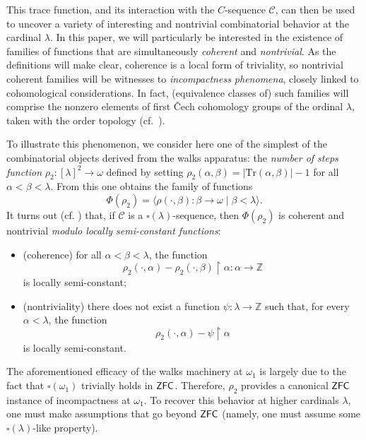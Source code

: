 \documentclass{amsart}
\numberwithin{theorem}{section}
\theoremstyle{definition}
\newcommand{\bb}{\mathbb}
\newcommand{\mc}{\mathcal}
\newcommand{\ra}{\rightarrow}
\newcommand{\Tr}{\mathrm{Tr}}
\newcommand{\ZFC}{\sf ZFC}
\begin{document}
This trace function, and its interaction with the $C$-sequence $\mc{C}$, can then be used 
to uncover a variety of interesting and nontrivial combinatorial behavior at the cardinal 
$\lambda$. In this paper, we will particularly be interested in the existence of families of 
functions that are simultaneously \emph{coherent} and \emph{nontrivial}. As the definitions will 
make clear, coherence is a local form of triviality, so nontrivial coherent families will be 
witnesses to \emph{incompactness phenomena}, closely linked to cohomological considerations. 
In fact, (equivalence classes of) such families will comprise the nonzero elements of first 
\v{C}ech cohomology groups of the ordinal $\lambda$, taken with the order topology 
(cf.\ \cite{cohomology_of_the_ordinals}).

To illustrate this phenomenon, we consider here one of the simplest of the combinatorial objects 
derived from the walks apparatus: the \emph{number of steps function} 
$\rho_2 : [\lambda]^2 \ra \omega$ defined by setting $\rho_2(\alpha,\beta) = 
|\Tr(\alpha,\beta)| - 1$ for all $\alpha < \beta < \lambda$. From this one obtains the family 
of functions 
\[
  \Phi(\rho_2) = \langle \rho(\cdot, \beta) : \beta \ra \omega \mid \beta < \lambda \rangle.
\]
It turns out (cf. \cite[\S 6.3 and \S 7.1]{todorcevic_walks_book}) that, if $\mc{C}$ is a 
$\square(\lambda)$-sequence, then $\Phi(\rho_2)$ is coherent and nontrivial \emph{modulo 
locally semi-constant functions}:
\begin{itemize}
  \item (coherence) for all $\alpha < \beta < \lambda$, the function
  \[
    \rho_2(\cdot,\alpha) - \rho_2(\cdot,\beta) \restriction \alpha : \alpha \ra \bb{Z}
  \]
  is locally semi-constant;
  \item (nontriviality) there does not exist a function $\psi:\lambda \ra \bb{Z}$ such that, 
  for every $\alpha < \lambda$, the function
  \[
    \rho_2(\cdot, \alpha) - \psi \restriction \alpha
  \]
  is locally semi-constant.
\end{itemize}
The aforementioned efficacy of the walks machinery at $\omega_1$ is largely due to the fact 
that $\square(\omega_1)$ trivially holds in $\ZFC$. Therefore, $\rho_2$ provides a 
canonical $\ZFC$ instance of incompactness at $\omega_1$. To recover this behavior at higher 
cardinals $\lambda$, one must make assumptions that go beyond $\ZFC$ (namely, one must 
assume some $\square(\lambda)$-like property).
\end{document}
